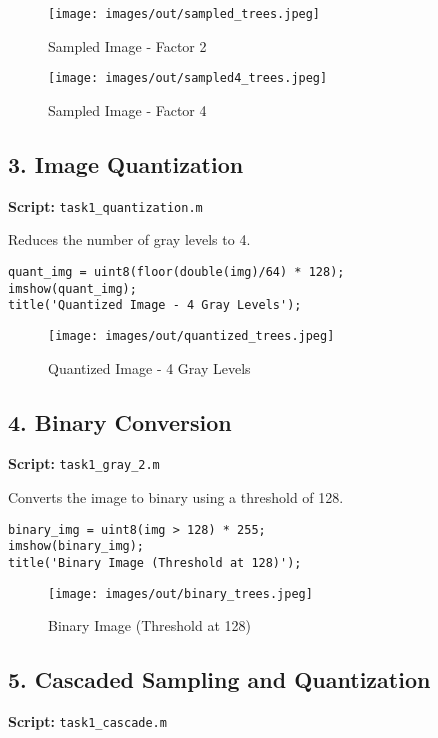 \documentclass[12pt,a4paper]{article}
\begin{document}
\begin{figure}[H]
    \centering
    \texttt{[image: images/out/sampled\_trees.jpeg]}
    \caption{Sampled Image - Factor 2}
\end{figure}
\begin{figure}[H]
    \centering
    \texttt{[image: images/out/sampled4\_trees.jpeg]}
    \caption{Sampled Image - Factor 4}
\end{figure}

\subsection*{3. Image Quantization}
\textbf{Script:} \texttt{task1\_quantization.m}

Reduces the number of gray levels to 4.

\begin{verbatim}
quant_img = uint8(floor(double(img)/64) * 128);
imshow(quant_img);
title('Quantized Image - 4 Gray Levels');
\end{verbatim}

\begin{figure}[H]
    \centering
    \texttt{[image: images/out/quantized\_trees.jpeg]}
    \caption{Quantized Image - 4 Gray Levels}
\end{figure}

\subsection*{4. Binary Conversion}
\textbf{Script:} \texttt{task1\_gray\_2.m}

Converts the image to binary using a threshold of 128.

\begin{verbatim}
binary_img = uint8(img > 128) * 255;
imshow(binary_img);
title('Binary Image (Threshold at 128)');
\end{verbatim}

\begin{figure}[H]
    \centering
    \texttt{[image: images/out/binary\_trees.jpeg]}
    \caption{Binary Image (Threshold at 128)}
\end{figure}

\subsection*{5. Cascaded Sampling and Quantization}
\textbf{Script:} \texttt{task1\_cascade.m}
\end{document}

